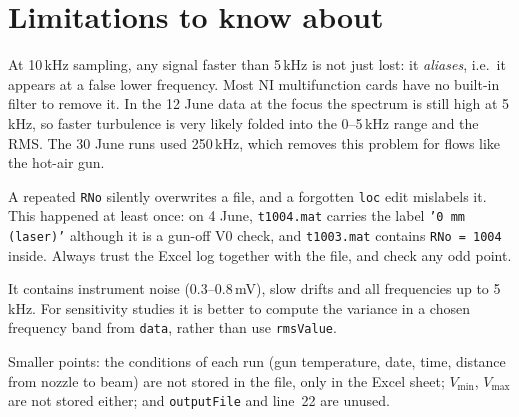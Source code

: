 \documentclass[11pt,a4paper]{article}
\newcommand{\code}[1]{\texttt{#1}}
\begin{document}
\section{Limitations to know about}
\begin{warn}
At 10\,kHz sampling, any signal faster than 5\,kHz is not just lost: it \emph{aliases}, i.e.\ it
appears at a false lower frequency. Most NI multifunction cards have no built-in filter to remove
it. In the 12 June data at the focus the spectrum is still high at 5\,kHz, so faster turbulence is
very likely folded into the 0--5\,kHz range and the RMS. The 30 June runs used 250\,kHz,
which removes this problem for flows like the hot-air gun.
\end{warn}
\begin{warn}
A repeated \code{RNo} silently overwrites a file, and a forgotten \code{loc} edit mislabels it.
This happened at least once: on 4 June, \code{t1004.mat} carries the label \code{'0 mm (laser)'}
although it is a gun-off V0 check, and \code{t1003.mat} contains \code{RNo = 1004} inside.
Always trust the Excel log together with the file, and check any odd point.
\end{warn}
\begin{warn}
It contains instrument noise (0.3--0.8\,mV), slow drifts and all frequencies up to 5\,kHz.
For sensitivity studies it is better to compute the variance in a chosen frequency band from
\code{data}, rather than use \code{rmsValue}.
\end{warn}
\noindent Smaller points: the conditions of each run (gun temperature, date, time, distance from
nozzle to beam) are not stored in the file, only in the Excel sheet; $V_{\min}$, $V_{\max}$ are
not stored either; and \code{outputFile} and line~22 are unused.
\end{document}
